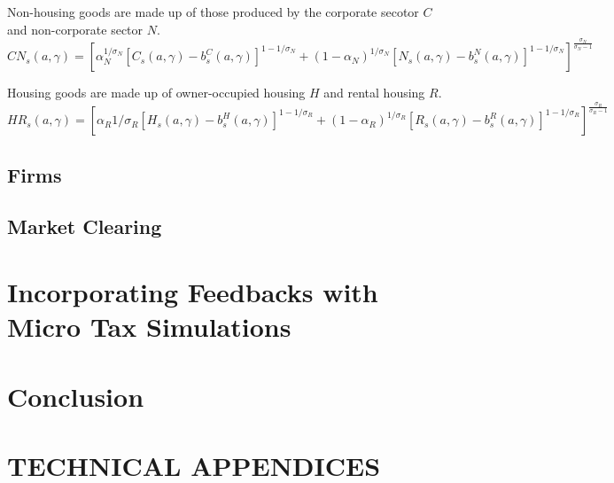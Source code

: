 \documentclass[letterpaper,12pt]{article}
\theoremstyle{definition}
\numberwithin{equation}{section}
\begin{document}
\begin{spacing}{1.5}
  Non-housing goods are made up of those produced by the corporate secotor $C$ and non-corporate sector $N$.
  \begin{equation}
  CN_s(a,\gamma) = \left[ \alpha_N^{1/\sigma_N} [C_s(a,\gamma)-b_s^C(a,\gamma)]^{1-1/\sigma_N} + (1-\alpha_N)^{1/\sigma_N} [N_s(a,\gamma)-b_s^N(a,\gamma)]^{1-1/\sigma_N} \right]^{\frac{\sigma_N}{\sigma_N-1}}
  \end{equation}

  Housing goods are made up of owner-occupied housing $H$ and rental housing $R$.
  \begin{equation}
  HR_s(a,\gamma) = \left[ \alpha_R{1/\sigma_R} [H_s(a,\gamma)-b_s^H(a,\gamma)]^{1-1/\sigma_R} + (1-\alpha_R)^{1/\sigma_R} [R_s(a,\gamma)-b_s^R(a,\gamma)]^{1-1/\sigma_R} \right]^{\frac{\sigma_R}{\sigma_R-1}}
  \end{equation}

  \subsection{Firms}

  \subsection{Market Clearing}

\section{Incorporating Feedbacks with Micro Tax Simulations}\label{SecMicro}

\section{Conclusion}\label{SecConclusion}


\end{spacing}


\newpage
\renewcommand{\theequation}{A.\arabic{section}.\arabic{equation}}
\renewcommand{\thedefinition}{A.\arabic{section}.\arabic{definition}}
\renewcommand{\thesection}{A-\arabic{section}}   %

\setcounter{equation}{0}                         %
\setcounter{section}{0}                          %
\section*{TECHNICAL APPENDICES}

\setcounter{definition}{0}
\setcounter{equation}{0}                         %




\newpage

\end{document}
